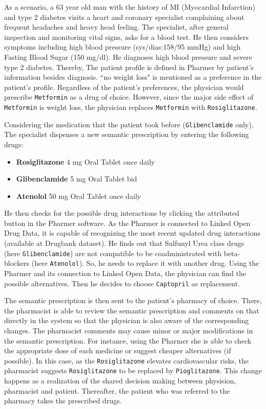 \documentclass[journal]{IEEEtran}
\begin{document}
As a scenario, a 63 year old man with the history of MI (Myocardial Infarction) and type 2 diabetes visits a heart and coronary specialist complaining about frequent headaches and heavy head feeling. The specialist, after general inspection and monitoring vital signs, asks for a blood test.
He then considers symptoms including high blood pressure (sys/dias:158/95 mmHg) and high Fasting Blood Sugar (150 mg/dl).
He diagnoses high blood pressure and severe type 2 diabetes.
Thereby, The patient profile is defined in Pharmer by patient's information besides diagnosis.
``no weight loss" is mentioned as a preference in the patient's profile.
Regardless of the patient's preferences, the physician would prescribe \texttt{Metformin} as a drug of choice.
However, since the major side effect of \texttt{Metformin} is weight loss, the physician replaces \texttt{Metformin} with \texttt{Rosiglitazone}.

Considering the medication that the patient took before (\texttt{Glibenclamide} only), The specialist dispenses a new semantic prescription by entering the following drugs:

\begin{itemize}
\item \textbf{Rosiglitazone} 4 mg Oral Tablet once daily
\item \textbf{Glibenclamide} 5 mg Oral Tablet bid
\item \textbf{Atenolol} 50 mg Oral Tablet once daily
\end{itemize}

He then checks for the possible drug interactions by clicking the attributed button in the Pharmer software.
As the Pharmer is connected to Linked Open Drug Data, it is capable of recognizing the most recent updated drug interactions (available at Drugbank dataset).
He finds out that Sulfunyl Urea class drugs (here \texttt{Glibenclamide}) are not compatible to be coadministrated with beta-blockers (here \texttt{Atenolol}).
So, he needs to replace it with another drug.
Using the Pharmer and its connection to Linked Open Data, the physician can find the possible alternatives.
Then he decides to choose \texttt{Captopril} as replacement.

The semantic prescription is then sent to the patient's pharmacy of choice.
There, the pharmacist is able to review the semantic prescription and comments on that directly in the system so that the physician is also aware of the corresponding changes.
The pharmacist comments may cause minor or major modifications in the semantic prescription.
For instance, using the Pharmer she is able to check the appropriate dose of each medicine or suggest cheaper alternatives (if possible).
In this case, as the \texttt{Rosiglitazone} elevates cardiovascular risks, the pharmacist suggests \texttt{Rosiglitazone} to be replaced by \texttt{Pioglitazone}.
This change happens as a realization of the shared decision making between physision, pharmacist and patient.
Thereafter, the patient who was referred to the pharmacy takes the prescribed drugs.
\end{document}
